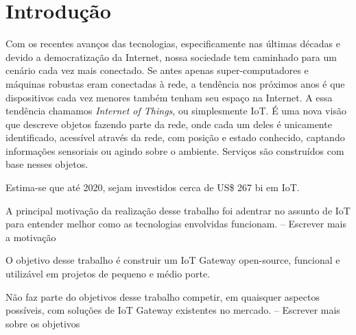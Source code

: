 \section*{Introdução}
\label{sec:intro}

Com os recentes avanços das tecnologias, especificamente nas últimas décadas e devido a democratização da Internet, nossa sociedade tem caminhado para um cenário cada vez mais conectado. Se antes apenas super-computadores e máquinas robustas eram conectadas à rede, a tendência nos próximos anos é que dispositivos cada vez menores também tenham seu espaço na Internet.
A essa tendência chamamos \textit{Internet of Things}, ou simplesmente IoT. É uma nova visão que descreve objetos fazendo parte da rede, onde cada um deles é unicamente identificado, acessível através da rede, com posição e estado conhecido, captando informações sensoriais ou agindo sobre o ambiente. Serviços são construídos com base nesses objetos.

Estima-se que até 2020, sejam investidos cerca de US\$ 267 bi em IoT. \cite{Forbes}

A principal motivação da realização desse trabalho foi adentrar no assunto de IoT para entender melhor como as tecnologias envolvidas funcionam.
-- Escrever mais a motivação

O objetivo desse trabalho é construir um IoT Gateway open-source, funcional e utilizável em projetos de pequeno e médio porte.

Não faz parte do objetivos desse trabalho competir, em quaisquer aspectos possíveis, com soluções de IoT Gateway existentes no mercado.
-- Escrever mais sobre os objetivos

